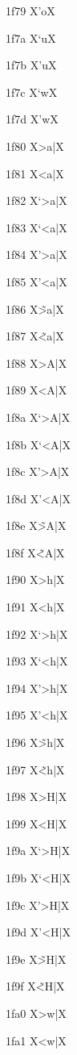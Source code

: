 \documentclass[11pt]{article}
\begin{document}
1f79 X{\textgreek{'o}}X

1f7a X{\textgreek{`u}}X

1f7b X{\textgreek{'u}}X

1f7c X{\textgreek{`w}}X

1f7d X{\textgreek{'w}}X

1f80 X{\textgreek{>a|}}X

1f81 X{\textgreek{<a|}}X

1f82 X{\textgreek{`>a|}}X

1f83 X{\textgreek{`<a|}}X

1f84 X{\textgreek{'>a|}}X

1f85 X{\textgreek{'<a|}}X

1f86 X{\textgreek{\~{>a}|}}X

1f87 X{\textgreek{\~{<a}|}}X

1f88 X{\textgreek{>A|}}X

1f89 X{\textgreek{<A|}}X

1f8a X{\textgreek{`>A|}}X

1f8b X{\textgreek{`<A|}}X

1f8c X{\textgreek{'>A|}}X

1f8d X{\textgreek{'<A|}}X

1f8e X{\textgreek{\~{>A}|}}X

1f8f X{\textgreek{\~{<A}|}}X

1f90 X{\textgreek{>h|}}X

1f91 X{\textgreek{<h|}}X

1f92 X{\textgreek{`>h|}}X

1f93 X{\textgreek{`<h|}}X

1f94 X{\textgreek{'>h|}}X

1f95 X{\textgreek{'<h|}}X

1f96 X{\textgreek{\~{>h}|}}X

1f97 X{\textgreek{\~{<h}|}}X

1f98 X{\textgreek{>H|}}X

1f99 X{\textgreek{<H|}}X

1f9a X{\textgreek{`>H|}}X

1f9b X{\textgreek{`<H|}}X

1f9c X{\textgreek{'>H|}}X

1f9d X{\textgreek{'<H|}}X

1f9e X{\textgreek{\~{>H}|}}X

1f9f X{\textgreek{\~{<H}|}}X

1fa0 X{\textgreek{>w|}}X

1fa1 X{\textgreek{<w|}}X
\end{document}
